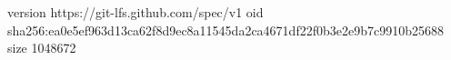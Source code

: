 version https://git-lfs.github.com/spec/v1
oid sha256:ea0e5ef963d13ca62f8d9ec8a11545da2ca4671df22f0b3e2e9b7c9910b25688
size 1048672
